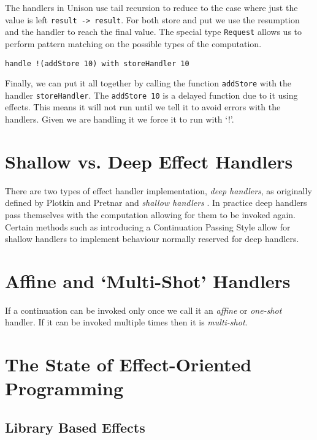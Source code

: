 \documentclass[logo,bsc,singlespacing,parskip]{infthesis}
\begin{document}
The handlers in Unison use tail recursion to reduce to the case where just the
value is left \texttt{result -> result}. For both store and put we use the
resumption and the handler to reach the final value. The special type
\texttt{Request} allows us to perform pattern matching on the possible types of
the computation.

\begin{lstlisting}
handle !(addStore 10) with storeHandler 10
\end{lstlisting}

Finally, we can put it all together by calling the function \texttt{addStore}
with the handler \texttt{storeHandler}. The \texttt{addStore 10} is a delayed
function due to it using effects. This means it will not run until we tell it to
avoid errors with the handlers. Given we are handling it we force it to run with
`!'.

\section{Shallow vs. Deep Effect Handlers}

There are two types of effect handler implementation, \emph{deep handlers}, as
originally defined by Plotkin and Pretnar \cite{plotkin2009handlers} and
\emph{shallow handlers} \cite{hillerstrom2018shallow}. In practice deep handlers
pass themselves with the computation allowing for them to be invoked again.
Certain methods such as introducing a Continuation Passing Style allow for
shallow handlers to implement behaviour normally reserved for deep handlers.

\section{Affine and `Multi-Shot' Handlers}

If a continuation can be invoked only once we call it an \emph{affine} or
\emph{one-shot} handler.  If it can be invoked multiple times then it is
\emph{multi-shot}.

\section{The State of Effect-Oriented Programming}

\subsection{Library Based Effects}
\end{document}
